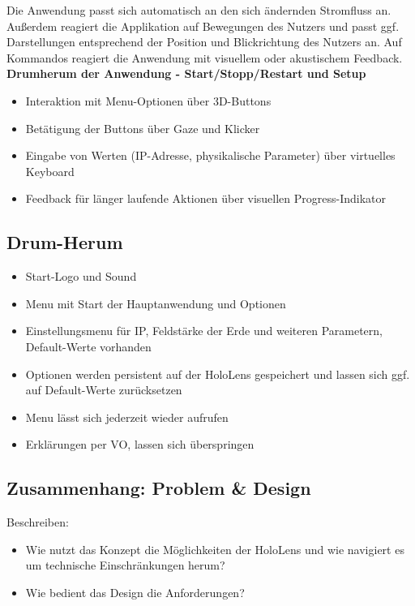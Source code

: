 Die Anwendung passt sich automatisch an den sich ändernden Stromfluss an. Außerdem reagiert die Applikation auf Bewegungen des Nutzers und passt ggf. Darstellungen entsprechend der Position und Blickrichtung des Nutzers an. Auf Kommandos reagiert die Anwendung mit visuellem oder akustischem Feedback.\\[4px]

\textbf{Drumherum der Anwendung - Start/Stopp/Restart und Setup}
\begin{itemize}[topsep=-2px]
	\setlength{\itemsep}{-5pt}
	\item Interaktion mit Menu-Optionen über 3D-Buttons
	\item Betätigung der Buttons über Gaze und Klicker
	\item Eingabe von Werten (IP-Adresse, physikalische Parameter) über virtuelles Keyboard
	\item Feedback für länger laufende Aktionen über visuellen Progress-Indikator
\end{itemize}

\subsection{Drum-Herum}
\begin{itemize}[topsep=-2px]
	\setlength{\itemsep}{-5pt}
	\item Start-Logo und Sound
	\item Menu mit Start der Hauptanwendung und Optionen
	\item Einstellungsmenu für IP, Feldstärke der Erde und weiteren Parametern, Default-Werte vorhanden
	\item Optionen werden persistent auf der HoloLens gespeichert und lassen sich ggf. auf Default-Werte zurücksetzen
	\item Menu lässt sich jederzeit wieder aufrufen
	\item Erklärungen per VO, lassen sich überspringen
\end{itemize}

\subsection{Zusammenhang: Problem \& Design}
Beschreiben: 
\begin{itemize}
	\item Wie nutzt das Konzept die Möglichkeiten der HoloLens und wie navigiert es um technische Einschränkungen herum?
	\item Wie bedient das Design die Anforderungen?
\end{itemize}

